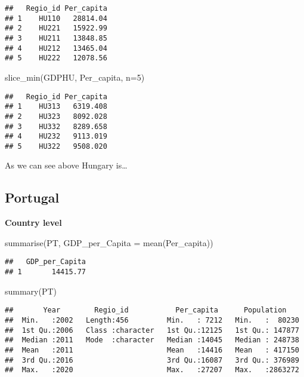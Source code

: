 \documentclass[
]{article}
\newenvironment{Shaded}{\begin{snugshade}}{\end{snugshade}}
\newcommand{\AttributeTok}[1]{\textcolor[rgb]{0.77,0.63,0.00}{#1}}
\newcommand{\DecValTok}[1]{\textcolor[rgb]{0.00,0.00,0.81}{#1}}
\newcommand{\FunctionTok}[1]{\textcolor[rgb]{0.00,0.00,0.00}{#1}}
\newcommand{\NormalTok}[1]{#1}
\begin{document}
\begin{verbatim}
##   Regio_id Per_capita
## 1    HU110   28814.04
## 2    HU221   15922.99
## 3    HU211   13848.85
## 4    HU212   13465.04
## 5    HU222   12078.56
\end{verbatim}

\begin{Shaded}
\begin{Highlighting}[]
\FunctionTok{slice\_min}\NormalTok{(GDPHU, Per\_capita, }\AttributeTok{n=}\DecValTok{5}\NormalTok{)}
\end{Highlighting}
\end{Shaded}

\begin{verbatim}
##   Regio_id Per_capita
## 1    HU313   6319.408
## 2    HU323   8092.028
## 3    HU332   8289.658
## 4    HU232   9113.019
## 5    HU322   9508.020
\end{verbatim}

As we can see above Hungary is\ldots{}

\hypertarget{portugal}{%
\subsection{Portugal}\label{portugal}}

\textbf{Country level}

\begin{Shaded}
\begin{Highlighting}[]
    \FunctionTok{summarise}\NormalTok{(PT, }\AttributeTok{GDP\_per\_Capita =} \FunctionTok{mean}\NormalTok{(Per\_capita))}
\end{Highlighting}
\end{Shaded}

\begin{verbatim}
##   GDP_per_Capita
## 1       14415.77
\end{verbatim}

\begin{Shaded}
\begin{Highlighting}[]
\FunctionTok{summary}\NormalTok{(PT)}
\end{Highlighting}
\end{Shaded}

\begin{verbatim}
##       Year        Regio_id           Per_capita      Population     
##  Min.   :2002   Length:456         Min.   : 7212   Min.   :  80230  
##  1st Qu.:2006   Class :character   1st Qu.:12125   1st Qu.: 147877  
##  Median :2011   Mode  :character   Median :14045   Median : 248738  
##  Mean   :2011                      Mean   :14416   Mean   : 417150  
##  3rd Qu.:2016                      3rd Qu.:16087   3rd Qu.: 376989  
##  Max.   :2020                      Max.   :27207   Max.   :2863272
\end{verbatim}
\end{document}
